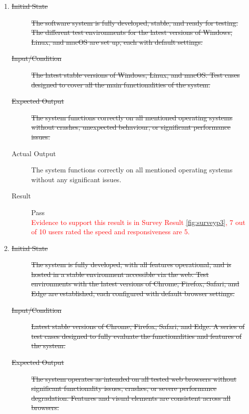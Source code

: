 \documentclass[12pt, titlepage]{article}
\newcommand{\rt}[1]{\textcolor{red}{#1}}
\begin{document}
\begin{enumerate}[NFR-T1]
  \item \label{NFRT16}
    \begin{description}
    \item[\sout{Initial State}]\sout{ The software system is fully developed, stable, and ready
      for testing. The different test environments for the latest versions of
      Windows, Linux, and macOS are set up, each with default settings.
    }\item[\sout{Input/Condition}]\sout{ The latest stable versions of Windows, Linux, and
      macOS. Test cases designed to cover all the main functionalities of the
      system.
    }\item[\sout{Expected Output}]\sout{ The system functions correctly on all mentioned
      operating systems without crashes, unexpected behaviour, or significant
      performance issues.
    }\item[Actual Output] The system functions correctly on all mentioned operating
      systems without any significant issues.
    \item[Result] Pass \\
    \rt{ Evidence to support this result is in Survey Result \ref{fig:surveyp3}, 7 out of 10 users rated the speed and responsiveness are 5. }
    \end{description}
  \item \label{NFRT17}
    \begin{description}
    \item[\sout{Initial State}]\sout{ The system is fully developed, with all features
      operational, and is hosted in a stable environment accessible via the web.
      Test environments with the latest versions of Chrome, Firefox, Safari, and
      Edge are established, each configured with default browser settings.
    }\item[\sout{Input/Condition}]\sout{ Latest stable versions of Chrome, Firefox, Safari, and
      Edge. A series of test cases designed to fully evaluate the
      functionalities and features of the system.
    }\item[\sout{Expected Output}]\sout{ The system operates as intended on all tested web
      browsers without significant functionality issues, crashes, or severe
      performance degradation. Features and visual elements are consistent across
      all browsers.
}
\end{description}
\end{enumerate}
\end{document}
